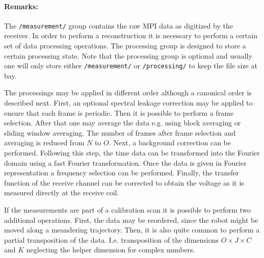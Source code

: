 \documentclass[landscape,a4paper]{article} %
\newcommand{\inl}[1]{\lstinline[columns=fixed]{#1}}
\begin{document}
\begin{multicols}{2}

\paragraph{Remarks:}
The \inl{/measurement/} group contains the raw MPI data as digitized by the receiver. In order to perform a reconstruction it is necessary to perform a certain set of data processing operations. The processing group is designed to store a certain processing state. Note that the processing group is optional and usually one will only store either \inl{/measurement/} or \inl{/processing/} to keep the file size at bay.

The processings may be applied in different order although a canonical order is described next. First, an optional spectral leakage correction may be applied to ensure that each frame is periodic. Then it is possible to perform a frame selection. After that one may average the data e.g. using block averaging or sliding window averaging. The number of frames after frame selection and averaging is reduced from $N$ to $O$. Next, a background correction can be performed. Following this step, the time data can be transformed into the Fourier domain using a fast Fourier transformation. Once the data is given in Fourier representation a frequency selection can be performed. Finally, the transfer function of the receive channel can be corrected to obtain the voltage as it is measured directly at the receive coil.

If the measurements are part of a calibration scan it is possible to perform two additional operations. First, the data may be reordered, since the robot might be moved along a meandering trajectory. Then, it is also quite common to perform a partial transposition of the data. I.e. transposition of the dimensions $O\times J\times C$ and $K$ neglecting the helper dimension for complex numbers.
\end{multicols}
\end{document}
